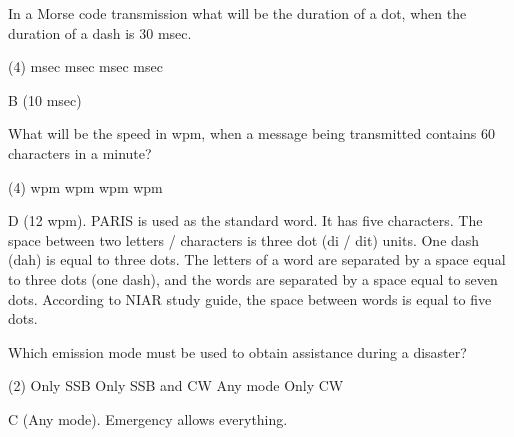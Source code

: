 \documentclass[a4paper]{article}
\begin{document}
\begin{question}In a Morse code transmission what will be the duration of a dot, when the duration of a dash is 30 msec.
	\begin{tasks}(4)
		 msec
		 msec
		 msec
		 msec
	\end{tasks}
\end{question}

\begin{solution}
	B (10 msec)
\end{solution}

\vspace{5mm}



\begin{question}What will be the speed in wpm, when a message being transmitted contains 60 characters in a minute?
	\begin{tasks}(4)
		 wpm
		 wpm
		 wpm
		 wpm
	\end{tasks}
\end{question}

\begin{solution}
	D (12 wpm). \apostrophe{}PARIS\apostrophe{} is used as the standard word. It has five characters. The space between two letters / characters is three dot (di / dit) units. One dash (dah) is equal to three dots. The letters of a word are separated by a space equal to three dots (one dash), and the words are separated by a space equal to seven dots. According to NIAR study guide, the space between words is equal to five dots.
\end{solution}

\vspace{5mm}




\begin{question}Which emission mode must be used to obtain assistance during a disaster?
	\begin{tasks}(2)
		\task Only SSB
		\task Only SSB and CW
		\task Any mode
		\task Only CW
	\end{tasks}
\end{question}

\begin{solution}
	C (Any mode). Emergency allows everything.
\end{solution}

\vspace{5mm}
\end{document}

